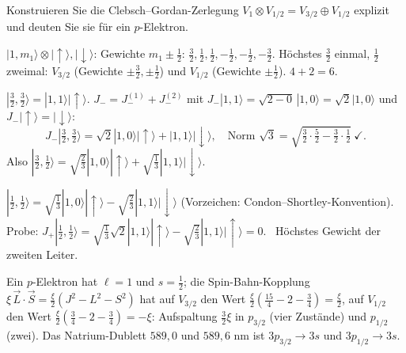 \begin{aufgabe}
Konstruieren Sie die Clebsch--Gordan-Zerlegung $V_1\otimes V_{1/2} = V_{3/2}\oplus V_{1/2}$ explizit und deuten Sie sie für ein $p$-Elektron.

\loesung
{}
$|1, m_1\rangle\otimes|{\uparrow}\rangle, |{\downarrow}\rangle$: Gewichte $m_1\pm\frac12$: $\frac32, \frac12, \frac12, -\frac12, -\frac12, -\frac32$. Höchstes $\frac32$ einmal, $\frac12$ zweimal: $V_{3/2}$ (Gewichte $\pm\frac32, \pm\frac12$) und $V_{1/2}$ (Gewichte $\pm\frac12$). $4 + 2 = 6$. \checkmark

$|\frac32, \frac32\rangle = |1, 1\rangle|{\uparrow}\rangle$. $J_- = J_-^{(1)} + J_-^{(2)}$ mit $J_-|1, 1\rangle = \sqrt{2 - 0}\,|1, 0\rangle = \sqrt2|1, 0\rangle$ und $J_-|{\uparrow}\rangle = |{\downarrow}\rangle$:
\[ J_-|\tfrac32, \tfrac32\rangle = \sqrt2|1, 0\rangle|{\uparrow}\rangle + |1, 1\rangle|{\downarrow}\rangle,\quad\text{Norm }\sqrt3 = \sqrt{\tfrac32\cdot\tfrac52 - \tfrac32\cdot\tfrac12}\ \checkmark . \]
Also $|\frac32, \frac12\rangle = \sqrt{\frac23}|1, 0\rangle|{\uparrow}\rangle + \sqrt{\frac13}|1, 1\rangle|{\downarrow}\rangle$.

$|\frac12, \frac12\rangle = \sqrt{\frac13}|1, 0\rangle|{\uparrow}\rangle - \sqrt{\frac23}|1, 1\rangle|{\downarrow}\rangle$ (Vorzeichen: Condon--Shortley-Konvention). Probe: $J_+|\frac12, \frac12\rangle = \sqrt{\frac13}\sqrt2|1, 1\rangle|{\uparrow}\rangle - \sqrt{\frac23}|1, 1\rangle|{\uparrow}\rangle = 0$. \checkmark\ Höchstes Gewicht der zweiten Leiter.

Ein $p$-Elektron hat $\ell = 1$ und $s = \frac12$; die Spin-Bahn-Kopplung $\xi\,\vec L\cdot\vec S = \frac\xi2(J^{2} - L^{2} - S^{2})$ hat auf $V_{3/2}$ den Wert $\frac\xi2(\frac{15}4 - 2 - \frac34) = \frac\xi2$, auf $V_{1/2}$ den Wert $\frac\xi2(\frac34 - 2 - \frac34) = -\xi$: Aufspaltung $\frac32\xi$ in $p_{3/2}$ (vier Zustände) und $p_{1/2}$ (zwei). Das Natrium-Dublett $589{,}0$ und $589{,}6$ nm ist $3p_{3/2}\to3s$ und $3p_{1/2}\to3s$.

\begin{center}
\begin{minipage}{0.88\textwidth}
\end{minipage}
\end{center}
\end{aufgabe}

